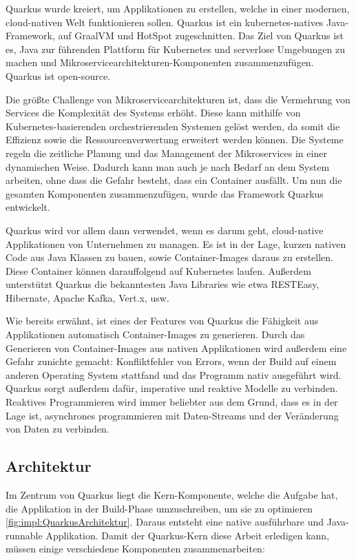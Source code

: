  
Quarkus wurde kreiert, um Applikationen zu erstellen, welche in einer modernen, cloud-nativen Welt funktionieren sollen. Quarkus ist ein kubernetes-natives Java-Framework, auf GraalVM und HotSpot zugeschnitten. Das Ziel von Quarkus ist es, Java zur führenden Plattform für Kubernetes und serverlose Umgebungen zu machen und Mikroservicearchitekturen-Komponenten zusammenzufügen. Quarkus ist open-source. \cite{quarkusOfficialSite}
 
Die größte Challenge von Mikroservicearchitekturen ist, dass die Vermehrung von Services die Komplexität des Systems erhöht. Diese kann mithilfe von Kubernetes-basierenden orchestrierenden Systemen gelöst werden, da somit die Effizienz sowie die Ressourcenverwertung erweitert werden können. Die Systeme regeln die zeitliche Planung und das Management der Mikroservices in einer dynamischen Weise. Dadurch kann man auch je nach Bedarf an dem System arbeiten, ohne dass die Gefahr besteht, dass ein Container ausfällt. Um nun die gesamten Komponenten zusammenzufügen, wurde das Framework Quarkus entwickelt.
 
Quarkus wird vor allem dann verwendet, wenn es darum geht, cloud-native Applikationen von Unternehmen zu managen. Es ist in der Lage, kurzen nativen Code aus Java Klassen zu bauen, sowie Container-Images daraus zu erstellen. Diese Container können darauffolgend auf Kubernetes laufen. Außerdem unterstützt Quarkus die bekanntesten Java Libraries wie etwa RESTEasy, Hibernate, Apache Kafka, Vert.x, usw.
 
Wie bereits erwähnt, ist eines der Features von Quarkus die Fähigkeit aus Applikationen automatisch Container-Images zu generieren. Durch das Generieren von Container-Images aus nativen Applikationen wird außerdem eine Gefahr zunichte gemacht: Konfliktfehler von Errors, wenn der Build auf einem anderen Operating System stattfand und das Programm nativ ausgeführt wird.
Quarkus sorgt außerdem dafür, imperative und reaktive Modelle zu verbinden. Reaktives Programmieren wird immer beliebter aus dem Grund, dass es in der Lage ist, asynchrones programmieren mit Daten-Streams und der Veränderung von Daten zu verbinden. \cite{QuarkusBuch}
 
\subsection{Architektur}
Im Zentrum von Quarkus liegt die Kern-Komponente, welche die Aufgabe hat, die Applikation in der Build-Phase umzuschreiben, um sie zu optimieren \ref{fig:impl:QuarkusArchitektur}. Daraus entsteht eine native ausführbare und Java-runnable Applikation. Damit der Quarkus-Kern diese Arbeit erledigen kann, müssen einige verschiedene Komponenten zusammenarbeiten:
 
